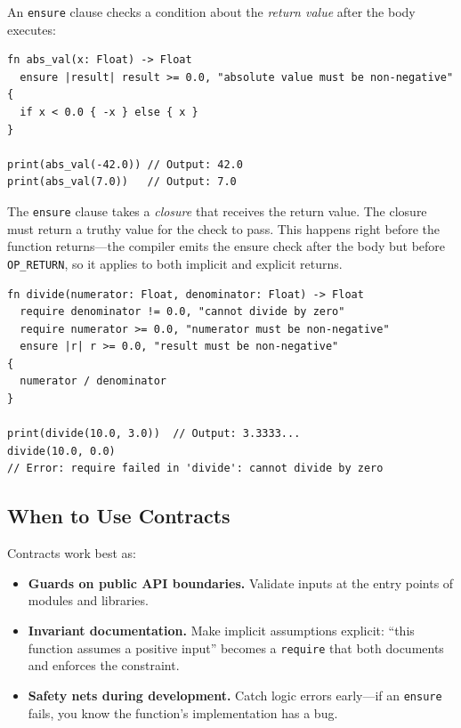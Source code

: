 An \lstinline|ensure| clause checks a condition about the \emph{return value} after the body executes:

\begin{lstlisting}[language=Lattice, caption={ensure postconditions}]
fn abs_val(x: Float) -> Float
  ensure |result| result >= 0.0, "absolute value must be non-negative"
{
  if x < 0.0 { -x } else { x }
}

print(abs_val(-42.0)) // Output: 42.0
print(abs_val(7.0))   // Output: 7.0
\end{lstlisting}

The \lstinline|ensure| clause takes a \emph{closure} that receives the return value. The closure must return a truthy value for the check to pass. This happens right before the function returns---the compiler emits the ensure check after the body but before \lstinline|OP_RETURN|, so it applies to both implicit and explicit returns.

\begin{lstlisting}[language=Lattice, caption={Multiple contracts on a function}]
fn divide(numerator: Float, denominator: Float) -> Float
  require denominator != 0.0, "cannot divide by zero"
  require numerator >= 0.0, "numerator must be non-negative"
  ensure |r| r >= 0.0, "result must be non-negative"
{
  numerator / denominator
}

print(divide(10.0, 3.0))  // Output: 3.3333...
divide(10.0, 0.0)
// Error: require failed in 'divide': cannot divide by zero
\end{lstlisting}

\subsection{When to Use Contracts}\label{sec:when-contracts}

Contracts work best as:

\begin{itemize}
  \item \textbf{Guards on public API boundaries.} Validate inputs at the entry points of modules and libraries.
  \item \textbf{Invariant documentation.} Make implicit assumptions explicit: ``this function assumes a positive input'' becomes a \lstinline|require| that both documents and enforces the constraint.
  \item \textbf{Safety nets during development.} Catch logic errors early---if an \lstinline|ensure| fails, you know the function's implementation has a bug.
\end{itemize}

